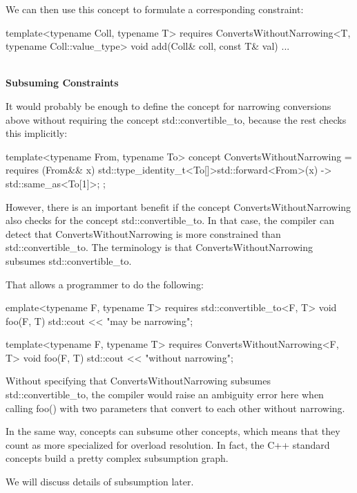 We can then use this concept to formulate a corresponding constraint:

\begin{cpp}
template<typename Coll, typename T>
requires ConvertsWithoutNarrowing<T, typename Coll::value_type>
void add(Coll& coll, const T& val)
{
	...
}
\end{cpp}

\noindent
\hspace*{\fill} \\ %
\textbf{Subsuming Constraints}

It would probably be enough to define the concept for narrowing conversions above without requiring the concept std::convertible\_to, because the rest checks this implicitly:

\begin{cpp}
template<typename From, typename To>
concept ConvertsWithoutNarrowing = requires (From&& x) {
	{ std::type_identity_t<To[]>{std::forward<From>(x)} } -> std::same_as<To[1]>;
};
\end{cpp}

However, there is an important benefit if the concept ConvertsWithoutNarrowing also checks for the concept std::convertible\_to. In that case, the compiler can detect that ConvertsWithoutNarrowing is more constrained than std::convertible\_to. The terminology is that ConvertsWithoutNarrowing subsumes std::convertible\_to.

That allows a programmer to do the following:

\begin{cpp}
emplate<typename F, typename T>
requires std::convertible_to<F, T>
void foo(F, T)
{
	std::cout << "may be narrowing\n";
}

template<typename F, typename T>
requires ConvertsWithoutNarrowing<F, T>
void foo(F, T)
{
	std::cout << "without narrowing\n";
}
\end{cpp}

Without specifying that ConvertsWithoutNarrowing subsumes std::convertible\_to, the compiler would raise an ambiguity error here when calling foo() with two parameters that convert to each other without narrowing.

In the same way, concepts can subsume other concepts, which means that they count as more specialized for overload resolution. In fact, the C++ standard concepts build a pretty complex subsumption graph.

We will discuss details of subsumption later.


